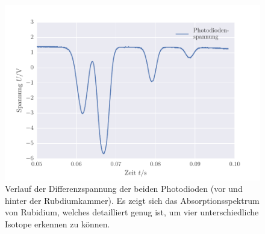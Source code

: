 \FloatBarrier
\begin{figure}[!h]
\centering
\includegraphics[scale=1]{../Grafiken/Absorptionsspektrum.pdf}
\caption{Verlauf der Differenzspannung der beiden Photodioden (vor und hinter der Rubdiumkammer).
	 Es zeigt sich das Absorptionsspektrum von Rubidium, welches detailliert genug ist, um 
	  vier unterschiedliche Isotope erkennen zu können. \label{fig:absorptionsspektrum}}
\end{figure}
\FloatBarrier